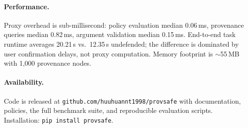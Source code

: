 \paragraph{Performance.}
Proxy overhead is sub-millisecond: policy evaluation median 0.06\,ms, provenance queries median 0.82\,ms, argument validation median 0.15\,ms. End-to-end task runtime averages 20.21\,s vs.\ 12.35\,s undefended; the difference is dominated by user confirmation delays, not proxy computation. Memory footprint is $\sim$55\,MB with 1,000 provenance nodes.

\paragraph{Availability.}
Code is released at \texttt{github.com/huuhuannt1998/provsafe} with documentation, policies, the full benchmark suite, and reproducible evaluation scripts. Installation: \texttt{pip install provsafe}.
